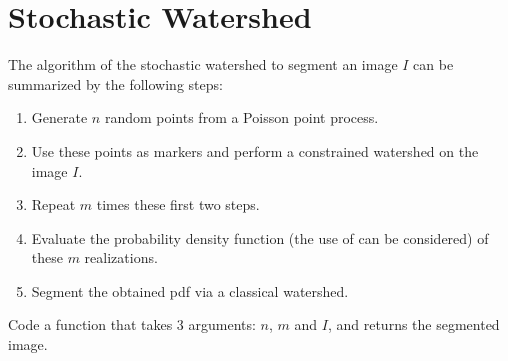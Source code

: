 

\section{Stochastic Watershed}
The algorithm of the stochastic watershed to segment an image $I$ can be summarized by the following steps:
\begin{enumerate}
 \item Generate $n$ random points from a Poisson point process.
 \item Use these points as markers and perform a constrained watershed on the image $I$.
 \item Repeat $m$ times these first two steps.
 \item Evaluate the probability density function (the use of  can be considered) of these $m$ realizations.
 \item Segment the obtained pdf via a classical watershed.
\end{enumerate}

\begin{qbox}
 Code a \matlabregistered{} function that takes 3 arguments: $n$, $m$ and $I$, and returns the segmented image.
\end{qbox}

